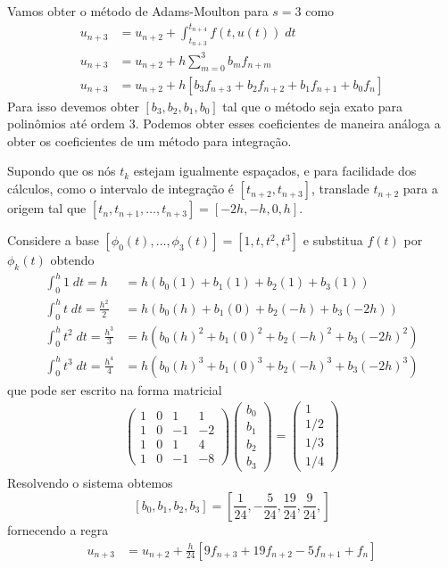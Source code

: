 \begin{ex}
Vamos obter o método de Adams-Moulton para $s=3$ como
\begin{eqnarray}\label{AM4}
  u_{n+3}  &= u_{n+2}  + \int _{t_{n+3}}^{t_{n+4}} f(t,u(t)) \; dt \\
  u_{n+3}  &= u_{n+2}  + h \sum_{m=0}^{3} b_m f_{n+m} \\
  u_{n+3}  &= u_{n+2}  + h [b_3f_{n+3} +b_2f_{n+2} +b_1f_{n+1} +b_0f_n]
\end{eqnarray}
Para isso devemos obter $[b_3,b_2,b_1,b_0]$ tal que o método seja exato para polinômios até ordem $3$. Podemos obter esses coeficientes de maneira análoga a obter os coeficientes de um método para integração.

Supondo que os nós $t_k$ estejam igualmente espaçados, e para facilidade dos cálculos, como o intervalo de integração é $[t_{n+2},t_{n+3}]$, translade $t_{n+2}$ para a origem tal que $[t_n,t_{n+1},\ldots ,t_{n+3}]=[-2h,-h,0,h]$.

Considere a base $[\phi _0(t),\ldots ,\phi _3(t)]=[1,t,t^2,t^3]$ e substitua $f(t)$ por $\phi _k(t)$ obtendo
\begin{eqnarray*}
      \int _0^{h} 1  \;dt = h             &= h( b_0(1)  +b_1(1)   + b_2(1)   + b_3(1)    )\\
      \int _0^{h} t  \;dt = \frac{h^2}{2}  &= h( b_0(h)  +b_1(0)   + b_2(-h) + b_3(-2h)  )\\
      \int _0^{h} t^2 \;dt = \frac{h^3}{3}  &= h( b_0(h)^2 +b_1(0)^2  + b_2(-h)^2+ b_3(-2h)^2 )\\
      \int _0^{h} t^3 \;dt = \frac{h^4}{4} &= h( b_0(h)^3 +b_1(0)^3  + b_2(-h)^3+ b_3(-2h)^3 )
\end{eqnarray*}
que pode ser escrito na forma matricial
\begin{eqnarray}
\left(
  \begin{array}{cccc}
    1  & 0 & 1    & 1   \\
    1  & 0 & -1   & -2  \\
    1  & 0 & 1    & 4   \\
    1  & 0 & -1   & -8
  \end{array}
\right)
\left(\begin{array}{c}  b_0 \\ b_1\\ b_2\\b_3   \end{array}\right)
=
\left(\begin{array}{c}  1  \\ 1/2 \\ 1/3 \\ 1/4  \end{array}\right)
\end{eqnarray}
Resolvendo o sistema obtemos
$$[b_0,b_1,b_2,b_3]=[\frac{1}{24},-\frac{5}{24},\frac{19}{24},\frac{9}{24},]$$
fornecendo a regra
\begin{eqnarray}
  u_{n+3}  &= u_{n+2}  + \frac{h}{24} [9 f_{n+3} +19f_{n+2} -5f_{n+1} +f_n]
\end{eqnarray}
\end{ex}

